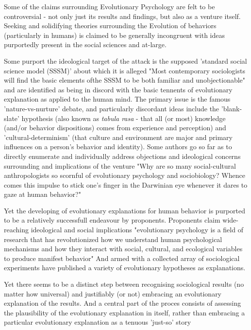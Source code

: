 \documentclass[journal,article,accept,oneauthors,pdftex,10pt,a4paper]{mdpi}
\begin{document}
Some of the claims surrounding Evolutionary Psychology are felt to be controversial - not only just its results and findings, but also as a venture itself.
Seeking and solidifying theories surrounding the Evolution of behaviors (particularly in humans) is claimed to be generally incongruent with ideas purportedly present in the social sciences and at-large.

Some purport the ideological target of the attack is the supposed 'standard social science model (SSSM)' \cite{adaptedmind} about which it is alleged "Most contemporary sociologists will find the basic elements ofthe SSSM to be both familiar and unobjectionable" \cite{darwinrevolution} and are identified as being in discord with the basic tennents of evolutionary explanation as applied to the human mind\cite{evolutionhandbook}.
The primary issue is the famous 'nature-vs-nurture' debate, and particularly discordant ideas include the 'blank-slate' hypothesis (also known as \textit{tabula rasa} - that all (or most) knowledge (and/or behavior dispositions) comes from experience and perception) and 'cultural-determinism' (that culture and environment are major and primary influences on a person's behavior and identity).
Some authors go so far as to directly enumerate and individually address objections and ideological concerns surrounding and implications of the venture "Why are so many social-cultural anthropologists so scornful of evolutionary psychology and sociobiology? Whence comes this impulse to stick one’s finger in the Darwinian eye whenever it dares to gaze at human behavior?" \cite{missingrevolution}

Yet the developing of evolutionary explanations for human behavior is purported to be a relatively successfull endeavour by proponents. Proponents claim wide-reaching ideological and social implications "evolutionary psychology is a field of research that has revolutionized how we understand human psychological mechanisms and how they interact with social, cultural, and ecological variables to produce manifest behavior"\cite{feminism}
And armed with a collected array of sociological experiments have published a variety of evolutionary hypotheses as explanations.\cite{socialisation}

Yet there seems to be a distinct step between recognising sociological results (no matter how universal) and justifiably (or not) embracing an evolutionary explanation of the results.
And a central part of the proces consists of assessing the plausibility of the evolutionary explanation in itself, rather than embracing a particular evolutionary explanation as a tenuous 'just-so' story \cite{justso}
\end{document}

